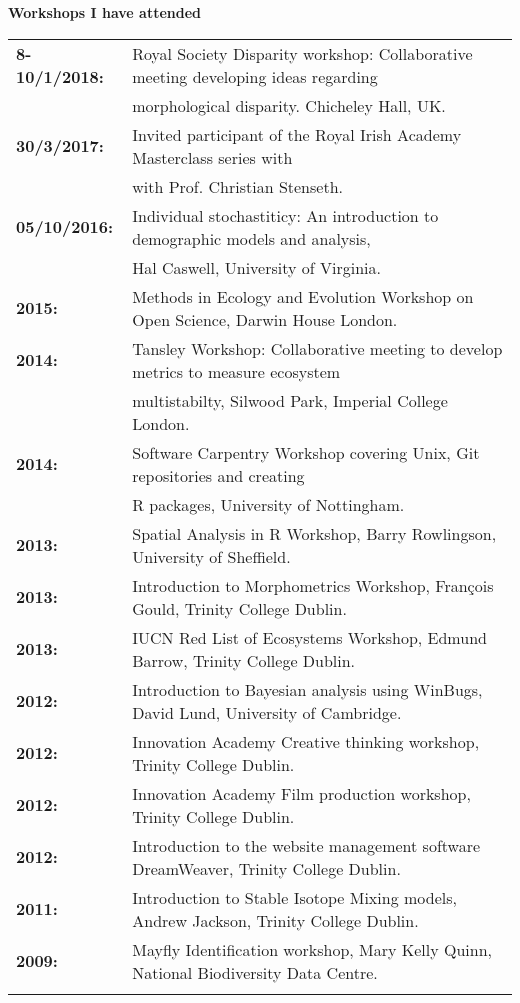 \documentclass[10pt,a4paper]{article}
\begin{document}
\raggedright\textbf{Workshops I have attended}\\
\begin{tabular}{ll}
\textbf{8-10/1/2018:} & Royal Society Disparity workshop: Collaborative meeting developing ideas regarding\\ 
&morphological disparity. Chicheley Hall, UK.\\
\textbf{30/3/2017:} & Invited participant of the Royal Irish Academy Masterclass series with\\
& with Prof. Christian Stenseth.\\
\textbf{05/10/2016:} & Individual stochastiticy: An introduction to demographic models and analysis,\\ 
&Hal Caswell, University of Virginia.\\
\textbf{2015:} & Methods in Ecology and Evolution Workshop on Open Science, Darwin House London.\\
\textbf{2014:} & Tansley Workshop: Collaborative meeting to develop metrics to measure ecosystem\\
&multistabilty, Silwood Park, Imperial College London.\\
\textbf{2014:} & Software Carpentry Workshop covering Unix, Git repositories and creating\\
&R packages, University of Nottingham.\\
\textbf{2013:} & Spatial Analysis in R Workshop, Barry Rowlingson, University of Sheffield.\\
\textbf{2013:} & Introduction to Morphometrics Workshop, François Gould, Trinity College Dublin.\\
\textbf{2013:} & IUCN Red List of Ecosystems Workshop, Edmund Barrow, Trinity College Dublin.\\
\textbf{2012:} & Introduction to Bayesian analysis using WinBugs, David Lund, University of Cambridge.\\
\textbf{2012:} & Innovation Academy Creative thinking workshop, Trinity College Dublin.\\
\textbf{2012:} & Innovation Academy Film production workshop, Trinity College Dublin.\\
\textbf{2012:} & Introduction to the website management software DreamWeaver, Trinity College Dublin.\\
\textbf{2011:} & Introduction to Stable Isotope Mixing models, Andrew Jackson, Trinity College Dublin.\\
\textbf{2009:} & Mayfly Identification workshop, Mary Kelly Quinn, National Biodiversity Data Centre.\\
&\\
\end{tabular}
\end{document}
